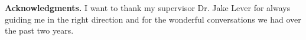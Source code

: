 {\bf Acknowledgments.}
I want to thank my supervisor Dr. Jake Lever for always guiding me in the right direction and for the wonderful conversations we had over the past two years.

